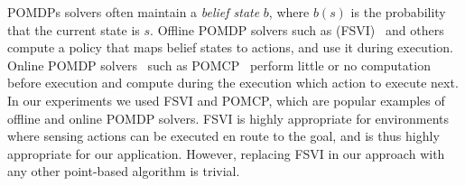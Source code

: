 \documentclass[letterpaper]{article} %
\newcommand{\tuple}[1]{\ensuremath{\left \langle #1 \right \rangle }}
\begin{document}
POMDPs solvers often maintain a \emph{belief state} $b$, where $b(s)$ is the probability that the current state is $s$. 
Offline POMDP solvers such as (FSVI)~\cite{shani2007forward} and others \cite{pineau2003point,spaan2005perseus,smith2012point} compute a policy that maps belief states to actions, and use it during execution. 
Online POMDP solvers~\cite{washington1997bi,silver2010monte,somani2013despot} such as POMCP~\cite{silver2010monte} perform little or no computation before execution and compute during the execution which action to execute next. 
In our experiments we used FSVI and POMCP, which are popular examples of offline and online POMDP solvers. FSVI is highly appropriate for environments where sensing actions can be executed en route to the goal, and is thus highly appropriate for our application. However, replacing FSVI in our approach with any other point-based algorithm is trivial.


\end{document}
